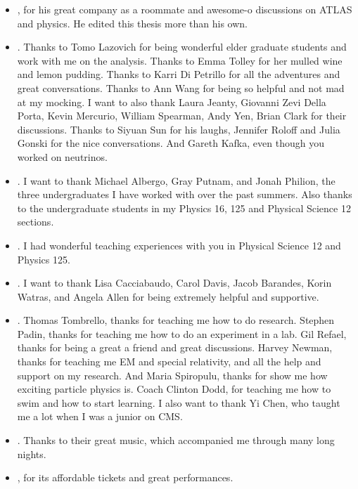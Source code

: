 \begin{itemize}
	\item {}, for his great company as a roommate and awesome-o discussions on ATLAS and physics. He edited this thesis more than his own.
	\item {}. Thanks to Tomo Lazovich for being wonderful elder graduate students and work with me on the analysis. Thanks to Emma Tolley for her mulled wine and lemon pudding. Thanks to Karri Di Petrillo for all the adventures and great conversations. Thanks to Ann Wang for being so helpful and not mad at my mocking. I want to also thank Laura Jeanty, Giovanni Zevi Della Porta, Kevin Mercurio, William Spearman, Andy Yen, Brian Clark for their discussions. Thanks to Siyuan Sun for his laughs, Jennifer Roloff and Julia Gonski for the nice conversations. And Gareth Kafka, even though you worked on neutrinos.
	\item {}. I want to thank Michael Albergo, Gray Putnam, and Jonah Philion, the three undergraduates I have worked with over the past summers. Also thanks to the undergraduate students in my Physics 16, 125 and Physical Science 12 sections.
	\item {}. I had wonderful teaching experiences with you in Physical Science 12 and Physics 125.
	\item {}. I want to thank Lisa Cacciabaudo, Carol Davis, Jacob Barandes, Korin Watras, and Angela Allen for being extremely helpful and supportive.
	\item {}. Thomas Tombrello, thanks for teaching me how to do research. Stephen Padin, thanks for teaching me how to do an experiment in a lab. Gil Refael, thanks for being a great a friend and great discussions. Harvey Newman, thanks for teaching me EM and special relativity, and all the help and support on my research. And Maria Spiropulu, thanks for show me how exciting particle physics is. Coach Clinton Dodd, for teaching me how to swim and how to start learning. I also want to thank Yi Chen, who taught me a lot when I was a junior on CMS.
	\item {}. Thanks to their great music, which accompanied me through many long nights.
	\item {}, for its affordable tickets and great performances.

\end{itemize}
